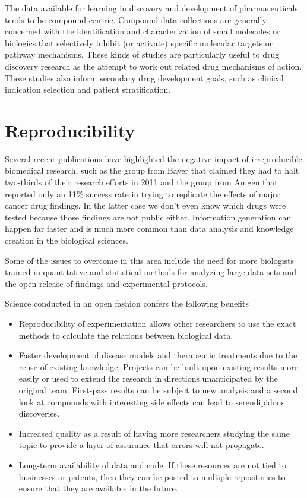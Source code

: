The data available for learning in discovery and development of pharmaceuticals tends to be compound-centric. Compound data collections are generally concerned with the identification and characterization of small molecules or biologics that selectively inhibit (or activate) specific molecular targets or pathway mechanisms. These kinds of studies are particularly useful to drug discovery research as the attempt to work out related drug mechanisms of action. These studies also inform secondary drug development goals, such as clinical indication selection and patient stratification. \cite{Berg2014}


\section{Reproducibility}

Several recent publications have highlighted the negative impact of irreproducible biomedical research, such as the group from Bayer that claimed they had to halt two-thirds of their research efforts in 2011 \cite{Prinz2011} and the group from Amgen that reported only an 11\% success rate in trying to replicate the effects of major cancer drug findings. \cite{Begley2012} In the latter case we don't even know which drugs were tested because those findings are not public either. Information generation can happen far faster and is much more common than data analysis and knowledge creation in the biological sciences.

Some of the issues to overcome in this area include the need for more biologists trained in quantitative and statistical methods for analyzing large data sets and the open release of findings and experimental protocols. 

Science conducted in an open fashion confers the following benefits

\begin{itemize}

\item Reproducibility of experimentation allows other researchers to use the exact methods to calculate the relations between biological data.

\item Faster development of disease models and therapeutic treatments due to the reuse of existing knowledge. Projects can be built upon existing results more easily or used to extend the research in directions unanticipated by the original team. First-pass results can be subject to new analysis and a second look at compounds with interesting side effects can lead to serendipidous discoveries.

\item Increased quality as a result of having more researchers studying the same topic to provide a layer of assurance that errors will not propagate.

\item Long-term availability of data and code. If these resources are not tied to businesses or patents, then they can be posted to multiple repositories to ensure that they are available in the future.
\cite{Prlic2012}

\end{itemize}

